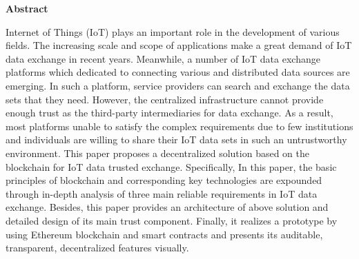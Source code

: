 
\begin{titlepage}
\begin{center}
\textbf{\LARGE{Abstract}}\\[1cm]
\end{center}
\normalsize
\par Internet of Things (IoT) plays an important role in
the development of various fields. The increasing scale and
scope of applications make a great demand of IoT data
exchange in recent years. Meanwhile, a number of IoT data
exchange platforms which dedicated to connecting various and
distributed data sources are emerging. In such a platform,
service providers can search and exchange the data sets that
they need. However, the centralized infrastructure cannot
provide enough trust as the third-party intermediaries for data exchange. As a result, most platforms unable to satisfy the complex requirements due to few institutions and individuals are willing to share their IoT data sets in such an
untrustworthy environment. This paper proposes a
decentralized solution based on the blockchain for IoT data
trusted exchange. Specifically, In this paper, the basic
principles of blockchain and corresponding key technologies
are expounded through in-depth analysis of three main reliable
requirements in IoT data exchange. Besides, this paper
provides an architecture of above solution and detailed design
of its main trust component. Finally, it realizes a prototype by
using Ethereum blockchain and smart contracts and presents
its auditable, transparent, decentralized features visually.
\end{titlepage}
